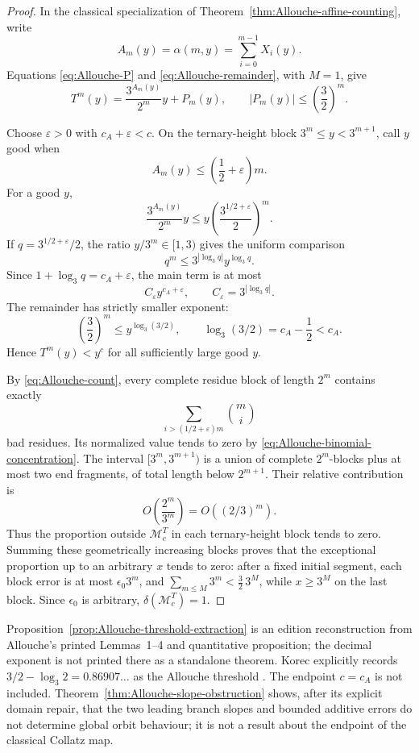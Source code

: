 \begin{proof}
In the classical specialization of
Theorem~\ref{thm:Allouche-affine-counting}, write
\[
 A_m(y)=\alpha(m,y)=\sum_{i=0}^{m-1}X_i(y).
\]
Equations \eqref{eq:Allouche-P} and \eqref{eq:Allouche-remainder}, with
\(M=1\), give
\begin{equation}
\label{eq:Allouche-classical-affine}
 T^m(y)=\frac{3^{A_m(y)}}{2^m}y+P_m(y),
 \qquad
 |P_m(y)|\le\left(\frac32\right)^m.
\end{equation}

Choose \(\varepsilon>0\) with \(c_A+\varepsilon<c\).  On the
ternary-height block \(3^m\le y<3^{m+1}\), call \(y\) good when
\[
 A_m(y)\le\left(\frac12+\varepsilon\right)m.
\]
For a good \(y\),
\[
 \frac{3^{A_m(y)}}{2^m}y
 \le y\left(\frac{3^{1/2+\varepsilon}}2\right)^m.
\]
If \(q=3^{1/2+\varepsilon}/2\), the ratio
\(y/3^m\in[1,3)\) gives the uniform comparison
\[
 q^m\le 3^{|\log_3q|}y^{\log_3q}.
\]
Since \(1+\log_3q=c_A+\varepsilon\), the main term is at most
\[
 C_\varepsilon y^{c_A+\varepsilon},
 \qquad C_\varepsilon=3^{|\log_3q|}.
\]
The remainder has strictly smaller exponent:
\[
 \left(\frac32\right)^m
 \le y^{\log_3(3/2)},
 \qquad
 \log_3(3/2)=c_A-\frac12<c_A.
\]
Hence \(T^m(y)<y^c\) for all sufficiently large good \(y\).

By \eqref{eq:Allouche-count}, every complete residue block of length \(2^m\)
contains exactly
\[
 \sum_{i>(1/2+\varepsilon)m}\binom mi
\]
bad residues.  Its normalized value tends to zero by
\eqref{eq:Allouche-binomial-concentration}.  The interval
\([3^m,3^{m+1})\) is a union of complete \(2^m\)-blocks plus at most two end
fragments, of total length below \(2^{m+1}\).  Their relative contribution is
\[
 O\left(\frac{2^m}{3^m}\right)=O((2/3)^m).
\]
Thus the proportion outside \(\mathcal M_c^T\) in each ternary-height block
tends to zero.  Summing these geometrically increasing blocks proves that
the exceptional proportion up to an arbitrary \(x\) tends to zero: after a
fixed initial segment, each block error is at most
\(\epsilon_0 3^m\), and \(\sum_{m\le M}3^m<\tfrac32\,3^M\), while
\(x\ge3^M\) on the last block.  Since \(\epsilon_0\) is arbitrary,
\(\delta(\mathcal M_c^T)=1\).
\end{proof}

\begin{nonclaim}
Proposition~\ref{prop:Allouche-threshold-extraction} is an edition
reconstruction from Allouche's printed Lemmas~1--4 and quantitative
proposition; the decimal exponent is not printed there as a standalone
theorem.  Korec explicitly records
\(3/2-\log_3 2=0.86907\ldots\) as the Allouche threshold
\cite[p.~86]{Korec1994}.  The endpoint \(c=c_A\) is not included.
Theorem~\ref{thm:Allouche-slope-obstruction} shows, after its explicit domain
repair, that the two leading branch slopes and bounded additive errors do
not determine global orbit behaviour; it is not a result about the endpoint
of the classical Collatz map.
\end{nonclaim}

